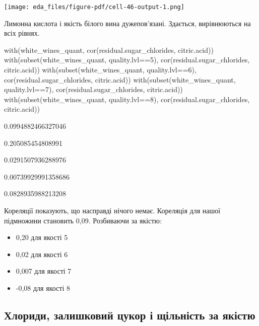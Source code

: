 \documentclass[
  letterpaper,
  DIV=11,
  numbers=noendperiod]{scrreprt}
\newenvironment{Shaded}{\begin{snugshade}}{\end{snugshade}}
\newcommand{\DecValTok}[1]{\textcolor[rgb]{0.68,0.00,0.00}{#1}}
\newcommand{\FunctionTok}[1]{\textcolor[rgb]{0.28,0.35,0.67}{#1}}
\newcommand{\NormalTok}[1]{\textcolor[rgb]{0.00,0.23,0.31}{#1}}
\newcommand{\SpecialCharTok}[1]{\textcolor[rgb]{0.37,0.37,0.37}{#1}}
\providecommand{\tightlist}{%
  \setlength{\itemsep}{0pt}\setlength{\parskip}{0pt}}\usepackage{longtable,booktabs,array}
\begin{document}
\texttt{[image: eda\_files/figure-pdf/cell-46-output-1.png]}

Лимонна кислота і якість білого вина дужепов'язані. Здається,
вирівнюються на всіх рівнях.

\begin{Shaded}
\begin{Highlighting}[]
\FunctionTok{with}\NormalTok{(white\_wines\_quant, }\FunctionTok{cor}\NormalTok{(residual.sugar\_chlorides, citric.acid))}
\FunctionTok{with}\NormalTok{(}\FunctionTok{subset}\NormalTok{(white\_wines\_quant, quality.lvl}\SpecialCharTok{==}\DecValTok{5}\NormalTok{),}
     \FunctionTok{cor}\NormalTok{(residual.sugar\_chlorides, citric.acid))}
\FunctionTok{with}\NormalTok{(}\FunctionTok{subset}\NormalTok{(white\_wines\_quant, quality.lvl}\SpecialCharTok{==}\DecValTok{6}\NormalTok{),}
     \FunctionTok{cor}\NormalTok{(residual.sugar\_chlorides, citric.acid))}
\FunctionTok{with}\NormalTok{(}\FunctionTok{subset}\NormalTok{(white\_wines\_quant, quality.lvl}\SpecialCharTok{==}\DecValTok{7}\NormalTok{),}
     \FunctionTok{cor}\NormalTok{(residual.sugar\_chlorides, citric.acid))}
\FunctionTok{with}\NormalTok{(}\FunctionTok{subset}\NormalTok{(white\_wines\_quant, quality.lvl}\SpecialCharTok{==}\DecValTok{8}\NormalTok{),}
     \FunctionTok{cor}\NormalTok{(residual.sugar\_chlorides, citric.acid))}
\end{Highlighting}
\end{Shaded}

0.0994882466327046

0.205085454808991

0.0291507936288976

0.00739929991358686

0.0828935988213208

Кореляції показують, що насправді нічого немає. Кореляція для нашої
підмножини становить 0,09. Розбиваючи за якістю:

\begin{itemize}
\tightlist
\item
  0,20 для якості 5
\item
  0,02 для якості 6
\item
  0,007 для якості 7
\item
  -0,08 для якості 8
\end{itemize}

\subsection{Хлориди, залишковий цукор і щільність за
якістю}\label{ux445ux43bux43eux440ux438ux434ux438-ux437ux430ux43bux438ux448ux43aux43eux432ux438ux439-ux446ux443ux43aux43eux440-ux456-ux449ux456ux43bux44cux43dux456ux441ux442ux44c-ux437ux430-ux44fux43aux456ux441ux442ux44e}
\end{document}
